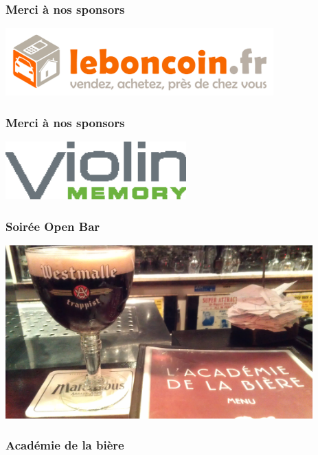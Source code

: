 \documentclass{beamer}
\begin{document}
\begin{frame}[fragile]
  \frametitle{Merci à nos sponsors}

  \begin{center}
    \includegraphics[height=7em]{LOGO_FINAL_VECTO.jpg}
  \end{center}
\end{frame}

\begin{frame}[fragile]
  \frametitle{Merci à nos sponsors}

  \begin{center}
    \includegraphics[height=6em]{VMLogoPMS.eps}
  \end{center}
\end{frame}

\begin{frame}[fragile]
  \frametitle{Soirée Open Bar}

  \begin{center}
    \includegraphics[height=18em]{academie-de-la-biere.jpg}
  \end{center}
\end{frame}

\begin{frame}[fragile]
  \frametitle{Académie de la bière}

\end{frame}
\end{document}
